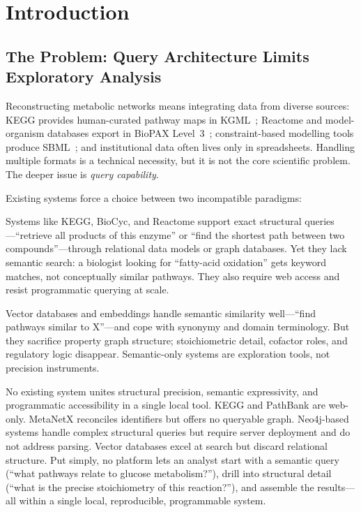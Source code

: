 \documentclass[10pt]{article}
\begin{document}
\section{Introduction}

\subsection{The Problem: Query Architecture Limits Exploratory Analysis}

Reconstructing metabolic networks means integrating data from diverse sources:
KEGG provides human-curated pathway maps in KGML~\citep{kanehisa2021kegg};
Reactome and model-organism databases export in
BioPAX Level~3~\citep{demir2010biopax}; constraint-based modelling tools
produce SBML~\citep{keating2020sbml}; and institutional data often lives only
in spreadsheets. Handling multiple formats is a technical necessity, but it is
not the core scientific problem. The deeper issue is \emph{query capability}.

Existing systems force a choice between two incompatible paradigms:

\begin{description}[leftmargin=*,itemsep=2pt]
  \item[Structural precision.] Systems like KEGG, BioCyc, and Reactome support
    exact structural queries---``retrieve all products of this enzyme'' or
    ``find the shortest path between two compounds''---through relational data
    models or graph databases. Yet they lack semantic search: a biologist
    looking for ``fatty-acid oxidation'' gets keyword matches, not conceptually
    similar pathways. They also require web access and resist programmatic
    querying at scale.

  \item[Semantic expressivity.] Vector databases and embeddings handle
    semantic similarity well---``find pathways similar to X''---and cope with
    synonymy and domain terminology. But they sacrifice property graph
    structure; stoichiometric detail, cofactor roles, and regulatory logic
    disappear. Semantic-only systems are exploration tools, not precision
    instruments.
\end{description}

No existing system unites structural precision, semantic expressivity, and
programmatic accessibility in a single local tool. KEGG and PathBank are
web-only. MetaNetX reconciles identifiers but offers no queryable graph.
Neo4j-based systems handle complex structural queries but require server
deployment and do not address parsing. Vector databases excel at search but
discard relational structure. Put simply, no platform lets an analyst start
with a semantic query (``what pathways relate to glucose metabolism?''), drill
into structural detail (``what is the precise stoichiometry of this
reaction?''), and assemble the results---all within a single local,
reproducible, programmable system.
\end{document}
